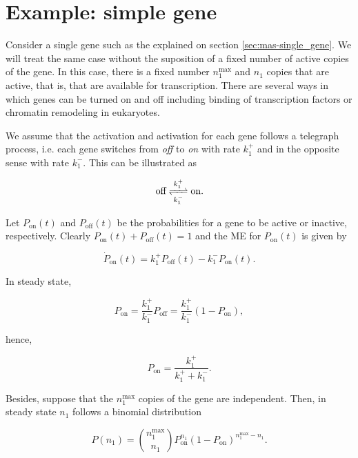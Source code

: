 \section{Example: simple gene}

Consider a single gene such as the explained on section \ref{sec:mas-single_gene}. We will treat the same case without the suposition of a fixed number of active copies of the gene. In this case, there is a fixed number $n_1^{\text{max}}$ and $n_1$ copies that are active, that is, that are available for transcription. There are several ways in which genes can be turned on and off including binding of transcription factors or chromatin remodeling in eukaryotes.

We assume that the activation and activation for each gene follows a telegraph process, i.e. each gene switches from \textit{off} to \textit{on} with rate $k_1^+$ and in the opposite sense with rate $k_1^-$. This can be illustrated as

\begin{equation*}
  \text{off}\ce{<=>[k_1^+][k_1^-]}\text{on}.
\end{equation*}

Let $P_\text{on}(t)$ and $P_\text{off}(t)$ be the probabilities for a gene to be active or inactive, respectively. Clearly $P_\text{on}(t) + P_\text{off}(t) = 1$ and the ME for $P_\text{on}(t)$ is given by

\begin{equation*}
  \dot{P}_\text{on}(t)=k_1^+P_\text{off}(t)-k_1^-P_\text{on}(t).
\end{equation*}

In steady state,

\begin{equation*}
  P_\text{on} = \frac{k_1^+}{k_1^-}P_\text{off} = \frac{k_1^+}{k_1^-}(1-P_\text{on}),
\end{equation*}

hence,

\begin{equation*}
  P_\text{on} = \frac{k_1^+}{k_1^++k_1^-}.
\end{equation*}

Besides, suppose that the $n_1^\text{max}$ copies of the gene are independent. Then, in steady state $n_1$ follows a binomial distribution

\begin{equation*}
  P(n_1) = {n_1^\text{max}\choose n_1} P_\text{on}^{n_1}(1-P_\text{on})^{n_1^\text{max}-n_1}.
\end{equation*}

